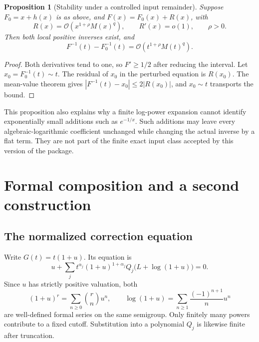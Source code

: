 \documentclass[11pt,a4paper]{article}
\newcommand{\OO}{\mathcal O}
\newtheorem{proposition}[theorem]{Proposition}
\theoremstyle{definition}
\begin{document}
\begin{proposition}[Stability under a controlled input remainder]
\label{prop:stability}
Suppose \(F_0=x+h(x)\) is as above, and
\(F(x)=F_0(x)+R(x)\), with
\[
 R(x)=\OO(x^{1+\rho}M(x)^q),\qquad R'(x)=o(1),\qquad\rho>0.
\]
Then both local positive inverses exist, and
\[
 F^{-1}(t)-F_0^{-1}(t)
 =\OO(t^{1+\rho}M(t)^q).
\]
\end{proposition}
\begin{proof}
Both derivatives tend to one, so \(F'\ge1/2\) after reducing the interval.
Let \(x_0=F_0^{-1}(t)\sim t\). The residual of \(x_0\) in the perturbed
equation is \(R(x_0)\). The mean-value theorem gives
\(|F^{-1}(t)-x_0|\le2|R(x_0)|\), and \(x_0\sim t\) transports the bound.
\end{proof}
This proposition also explains why a finite log-power expansion cannot
identify exponentially small additions such as \(e^{-1/x}\). Such additions
may leave every algebraic-logarithmic coefficient unchanged while changing
the actual inverse by a flat term. They are not part of the finite exact input
class accepted by this version of the package.

\section{Formal composition and a second construction}
\subsection{The normalized correction equation}
Write \(G(t)=t(1+u)\). Its equation is
\begin{equation}\label{eq:correction}
 u+\sum_j t^{\alpha_j}(1+u)^{1+\alpha_j}
 Q_j\bigl(L+\log(1+u)\bigr)=0.
\end{equation}
Since \(u\) has strictly positive valuation, both
\begin{equation}\label{eq:jets}
 (1+u)^r=\sum_{n\ge0}\binom rn u^n,
 \qquad
 \log(1+u)=\sum_{n\ge1}\frac{(-1)^{n+1}}n u^n
\end{equation}
are well-defined formal series on the same semigroup. Only finitely many
powers contribute to a fixed cutoff. Substitution into a polynomial
\(Q_j\) is likewise finite after truncation.
\end{document}
